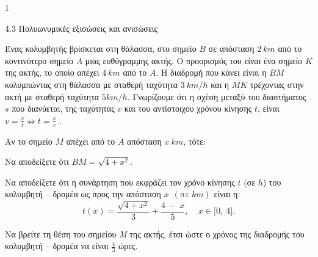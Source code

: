 \begin{ylh}{1}
\item 4.3 Πολυωνυμικές εξισώσεις και ανισώσεις
\end{ylh}
Ένας κολυμβητής βρίσκεται στη θάλασσα, στο σημείο $Β$ σε απόσταση $2\ km$ από το κοντινότερο σημείο $A$ μιας ευθύγραμμης ακτής. Ο προορισμός του είναι ένα σημείο $K$ της ακτής, το οποίο απέχει $4\ km$ από το $A$. Η διαδρομή που κάνει είναι η $BM$ κολυμπώντας στη θάλασσα με σταθερή ταχύτητα $3\ km/h$ και η $MK$ τρέχοντας στην ακτή με σταθερή ταχύτητα $5km/h$\emph{.}
Γνωρίζουμε ότι η σχέση μεταξύ του διαστήματος $s$ που διανύεται, της ταχύτητας $v$ και του αντίστοιχου χρόνου κίνησης $t$, είναι $v = \frac{s}{t} \Leftrightarrow t = \frac{s}{v}$ .
\begin{center}
\end{center}
Αν το σημείο $M$ απέχει από το $A$ απόσταση $x\ km$, τότε:
\begin{alist}
\item Να αποδείξετε ότι $ΒΜ = \sqrt{4 + x^{2}}$.
\item Να αποδείξετε ότι η συνάρτηση που εκφράζει τον χρόνο κίνησης $t$ (σε $h$) του κολυμβητή -- δρομέα ως προς την απόσταση $x\ \ (\text{σε}\ km)$ είναι η:
\begin{equation*}t(x) = \frac{\sqrt{4 + x^{2}}}{3} + \frac{4\  - \ x}{5},\ \ \ \ \ x \in \lbrack 0,\ 4\rbrack.\end{equation*}
\item Να βρείτε τη θέση του σημείου \emph{Μ} της ακτής, έτσι ώστε ο χρόνος της διαδρομής του κολυμβητή -- δρομέα να είναι $\frac{4}{3}$ ώρες.
\end{alist}

